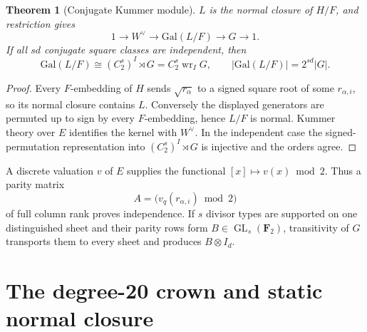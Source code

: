 \documentclass[11pt]{article}
\newtheorem{theorem}{Theorem}[section]
\theoremstyle{definition}
\theoremstyle{remark}
\newcommand{\Gal}{\mathrm{Gal}}
\newcommand{\wrp}{\mathop{\mathrm{wr}}}
\begin{document}
\begin{theorem}[Conjugate Kummer module]
\label{thm:kummermodule}
$L$ is the normal closure of $H/F$, and restriction gives
\begin{equation}
1\longrightarrow W^\vee\longrightarrow\Gal(L/F)
\longrightarrow G\longrightarrow1.
\end{equation}
If all $sd$ conjugate square classes are independent, then
\begin{equation}
\Gal(L/F)\cong(C_2^s)^I\rtimes G=C_2^s\wrp_I G,
\qquad |\Gal(L/F)|=2^{sd}|G|.
\label{eq:wreathlift}
\end{equation}
\end{theorem}

\begin{proof}
Every $F$-embedding of $H$ sends $\sqrt{r_\alpha}$ to a signed square root of
some $r_{\alpha,i}$, so its normal closure contains $L$.  Conversely the
displayed generators are permuted up to sign by every $F$-embedding, hence
$L/F$ is normal.  Kummer theory over $E$ identifies the kernel with $W^\vee$.
In the independent case the signed-permutation representation into
$(C_2^s)^I\rtimes G$ is injective and the orders agree.
\end{proof}

A discrete valuation $v$ of $E$ supplies the functional
$[x]\mapsto v(x)\bmod2$.  Thus a parity matrix
\begin{equation}
A=\bigl(v_q(r_{\alpha,i})\bmod2\bigr)
\label{eq:valuationmatrix}
\end{equation}
of full column rank proves independence.  If $s$ divisor types are supported
on one distinguished sheet and their parity rows form
$B\in\operatorname{GL}_s(\mathbf F_2)$, transitivity of $G$ transports them
to every sheet and produces $B\otimes I_d$.

\section{The degree-20 crown and static normal closure}
\label{sec:crown}
\end{document}
